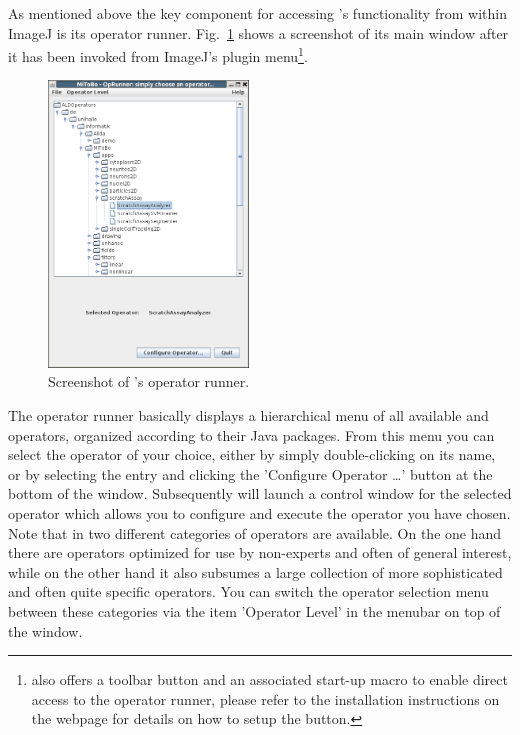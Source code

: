 \vspace*{-0.75cm}
As mentioned above the key component for accessing \mitobo's functionality from within ImageJ is
its operator runner. Fig.~\ref{fig:oprunner} shows a screenshot of its main window after it has 
been invoked from ImageJ's plugin menu\footnote{\mitobo also offers a toolbar button and an associated start-up macro
to enable direct access to the operator runner, please refer to the installation instructions on the webpage for details on 
how to setup the button.}.

\begin{figure}
\vspace*{-1.6cm}
\begin{center}
\includegraphics[width=0.475\textwidth]{../images/ScreenshotOpRunner.png}
\vspace*{-0.45cm}
\caption{\label{fig:oprunner}Screenshot of \mitobo's operator runner.}
\end{center}
\end{figure}
The operator runner basically displays a hierarchical menu of all available \alida and \mitobo
operators, organized according to their Java packages. From this menu you can select the 
operator of your choice, either by simply double-clicking on its name, or by selecting the entry
and clicking the 'Configure Operator \ldots' button at the bottom of the window. 
Subsequently \mitobo will launch a control window 
for the selected operator which allows you to configure and execute the operator you have chosen. 
Note that in \mitobo two different categories of operators are available. On the one hand there
are operators optimized for use by non-experts and often of general interest, while on the 
other hand it also subsumes a large collection of more sophisticated and often quite specific
operators. You can switch the operator selection menu between these categories via the 
item 'Operator Level' in the menubar on top of the window.
  

